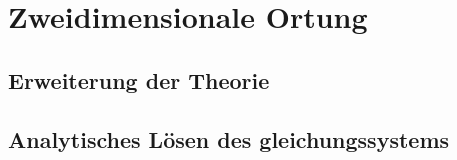   \section{Zweidimensionale Ortung} 
      \subsection{Erweiterung der Theorie}
      \subsection{Analytisches Lösen des gleichungssystems}
